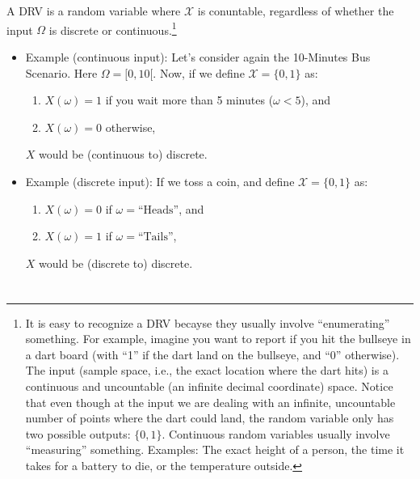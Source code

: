   
\section{} %

A \gls{DRV} is a random variable where $\mathcal{X}$ is conuntable,
regardless of whether the input $\Omega$ is discrete or
continuous.\footnote{It is easy to recognize a \gls{DRV} becayse they
  usually involve ``enumerating'' something. For example, imagine you
  want to report if you hit the bullseye in a dart board (with ``1''
  if the dart land on the bullseye, and ``0'' otherwise). The input
  (sample space, i.e., the exact location where the dart hits) is a
  continuous and uncountable (an infinite decimal coordinate)
  space. Notice that even though at the input we are dealing with an
  infinite, uncountable number of points where the dart could land,
  the random variable only has two possible outputs:
  $\{0,1\}$. Continuous random variables usually involve ``measuring''
  something. Examples: The exact height of a person, the time it takes
  for a battery to die, or the temperature outside.}

\begin{itemize}
\item Example (continuous input): Let's consider again the 10-Minutes
  Bus Scenario. Here $\Omega=[0,10[$. Now, if we define
  $\mathcal{X}=\{0,1\}$ as:
\begin{enumerate}
\item $X(\omega)=1$ if you wait more than 5 minutes ($\omega<5$), and
\item $X(\omega)=0$ otherwise,
\end{enumerate}
$X$ would be (continuous to) discrete.

\item Example (discrete input): If we toss a coin, and define
  $\mathcal{X}=\{0,1\}$ as:
\begin{enumerate}
\item $X(\omega)=0$ if $\omega=\text{``Heads''}$, and
\item $X(\omega)=1$ if $\omega=\text{``Tails''}$,
\end{enumerate}
$X$ would be (discrete to) discrete.
\end{itemize}


\section{} %

